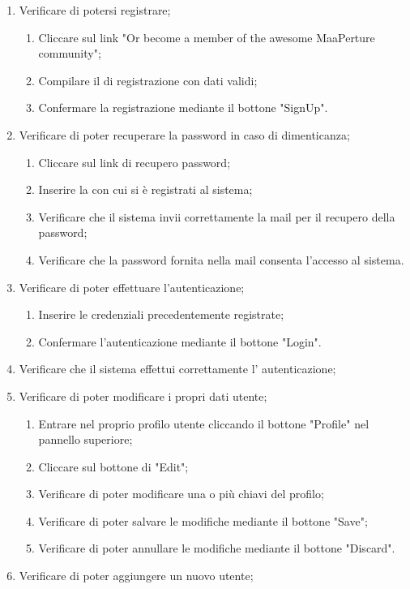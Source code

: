 \begin{enumerate}
\item Verificare di potersi registrare;
\begin{enumerate}
\item Cliccare sul link "Or become a member of the awesome MaaPerture community";
\item Compilare il  di registrazione con dati validi;
\item Confermare la registrazione mediante il bottone "SignUp".
\end{enumerate}
\item Verificare di poter recuperare la password in caso di dimenticanza;
\begin{enumerate}
\item Cliccare sul link di recupero password;
\item Inserire la  con cui si è registrati al sistema;
\item Verificare che il sistema invii correttamente la mail per il recupero della password;
\item Verificare che la password fornita nella mail consenta l'accesso al sistema.
\end{enumerate}
\item Verificare di poter effettuare l'autenticazione;
\begin{enumerate}
\item Inserire le credenziali precedentemente registrate;
\item Confermare l'autenticazione mediante il bottone "Login".
\end{enumerate}
\item Verificare che il sistema effettui correttamente l' autenticazione;
\item Verificare di poter modificare i propri dati utente;
\begin{enumerate}
\item Entrare nel proprio profilo utente cliccando il bottone "Profile" nel pannello superiore;
\item Cliccare sul bottone di "Edit";
\item Verificare di poter modificare una o più chiavi del profilo;
\item Verificare di poter salvare le modifiche mediante il bottone "Save";
\item Verificare di poter annullare le modifiche mediante il bottone "Discard".
\end{enumerate}
\item Verificare di poter aggiungere un nuovo utente;

\end{enumerate}
